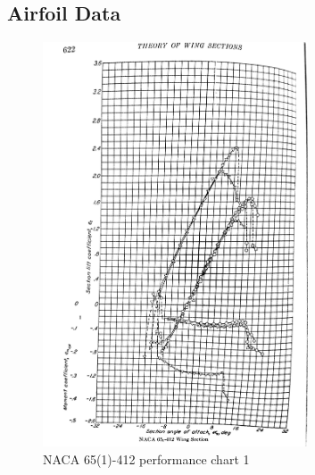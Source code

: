 \documentclass[conf]{new-aiaa}
\begin{document}
\subsection*{Airfoil Data}
\begin{figure}[H]
    \centering
    \includegraphics[width=0.7\textwidth]{plots/Airfoil65_1_412-a}
    \caption{NACA 65(1)-412 performance chart 1}
    \label{fig:NACA_65412A}
\end{figure}
\end{document}
